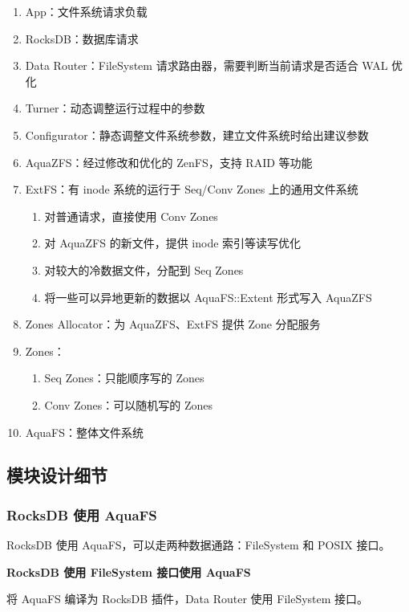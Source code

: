 \begin{enumerate}
    \item App：文件系统请求负载
    \item RocksDB：数据库请求
    \item Data Router：FileSystem 请求路由器，需要判断当前请求是否适合 WAL 优化
    \item Turner：动态调整运行过程中的参数
    \item Configurator：静态调整文件系统参数，建立文件系统时给出建议参数
    \item AquaZFS：经过修改和优化的 ZenFS，支持 RAID 等功能
    \item ExtFS：有 inode 系统的运行于 Seq/Conv Zones 上的通用文件系统
        \begin{enumerate}
            \item 对普通请求，直接使用 Conv Zones
            \item 对 AquaZFS 的新文件，提供 inode 索引等读写优化
            \item 对较大的冷数据文件，分配到 Seq Zones
            \item 将一些可以异地更新的数据以 AquaFS::Extent 形式写入 AquaZFS
        \end{enumerate}
    \item Zones Allocator：为 AquaZFS、ExtFS 提供 Zone 分配服务
    \item Zones：
        \begin{enumerate}
            \item Seq Zones：只能顺序写的 Zones
            \item Conv Zones：可以随机写的 Zones
        \end{enumerate}
    \item AquaFS：整体文件系统
\end{enumerate}

\subsection{模块设计细节}

\subsubsection*{RocksDB 使用 AquaFS}

RocksDB 使用 AquaFS，可以走两种数据通路：FileSystem 和 POSIX 接口。

\textbf{RocksDB 使用 FileSystem 接口使用 AquaFS}

将 AquaFS 编译为 RocksDB 插件，Data Router 使用 FileSystem 接口。

